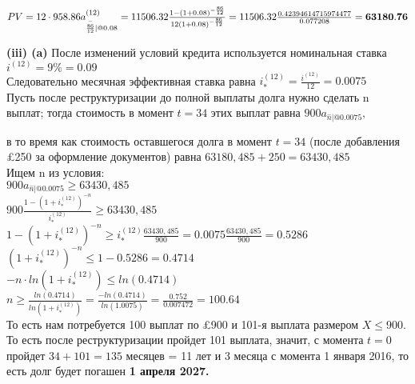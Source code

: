 \documentclass{article}
\begin{document}
 $PV= 12\cdot 958.86 a^{(12)}_{\overset {-} {\frac {86 }{12} } | @  0.08}  =
 11506.32 \frac{ 1- (1+0.08)^{-\frac{86}{12} } }{12(1+0.08)^{- \frac {86}{12}} }=  
   11506.32 \frac{  0.42394614715974477 }{0.077208} = \bf 63180.76$
 
 
 

{\bf \large  (iii) (a)}  После изменений условий кредита используется номинальная ставка $i^{(12)} = 9\% = 0.09$\\

Следовательно месячная эффективная ставка равна $ i_{*}^{(12)} = \frac{ i^{(12)} }{12} = 0.0075$\\

Пусть после реструктуризации до полной выплаты долга нужно сделать n выплат; тогда стоимость  в момент $t=34$  этих выплат равна 
$ 900a_{\overset{-}n |@0.0075 } ,$

в то время как стоимость оставшегося долга в момент $t=34$  (после добавления \pounds 250 за оформление документов)  равна   $63180,485+250=63430,485$\\

Ищем n из условия:\\

 $ 900a_{\overset{-}n |@0.0075 } \geq  63430,485$\\
 
$900 \frac{  1 - (1+i_{*}^{(12)} )^{-n}  }{ i_{*}^{(12)} } \geq  63430,485$\\

$  1 - (1+i_{*}^{(12)} )^{-n}   \geq   i_{*}^{(12)}  \frac {63430,485}{900} =   0.0075 \frac {63430,485}{900}  = 0.5286$\\


$   (1+i_{*}^{(12)} )^{-n}   \leq  1- 0.5286 =  0.4714$\\

$  -n\cdot ln (1+i_{*}^{(12)} )   \leq  ln(  0.4714)$\\

$ n \geq \frac{ ln(  0.4714)}{  ln (1+i_{*}^{(12)} ) } = \frac{- ln(  0.4714)}{  ln (1.0075) } = \frac{ 0.752}{0.007472} = 100.64$\\

То есть нам потребуется 100 выплат по \pounds900 и 101-я выплата размером $X\leq900.$\\

То есть после реструктуризации пройдет 101 выплата, значит, с момента $t=0$ пройдет $ 34+101 = 135$
 месяцев = 11 лет и 3 месяца с момента 1 января 2016,  то есть долг будет погашен {\bf 1 апреля 2027.}\\
 
\end{document}
